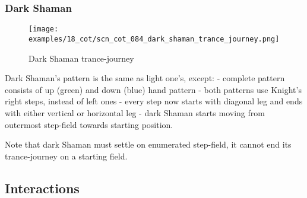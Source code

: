 \clearpage %

\subsubsection*{Dark Shaman}
\label{sec:Conquest of Tlalocan/Trance-journey/Movement/Dark Shaman}

\vspace*{-1.5\baselineskip}
\noindent
\begin{figure}[!h]
\texttt{[image: examples/18\_cot/scn\_cot\_084\_dark\_shaman\_trance\_journey.png]}
\vspace*{-1.4\baselineskip}
\caption{Dark Shaman trance-journey}
\label{fig:scn_cot_084_dark_shaman_trance_journey}
\end{figure}

\vspace*{-0.5\baselineskip}
Dark Shaman's pattern is the same as light one's, except:\newline
- complete pattern consists of up (green) and down (blue) hand pattern\newline
- both patterns use Knight's right steps, instead of left ones\newline
- every step now starts with diagonal leg and ends with either vertical or horizontal leg\newline
- dark Shaman starts moving from outermost step-field towards starting position.

\clearpage %

Note that dark Shaman must settle on enumerated step-field, it cannot end its
trance-journey on a starting field.


\subsection*{Interactions}
\label{sec:Conquest of Tlalocan/Trance-journey/Interactions}

